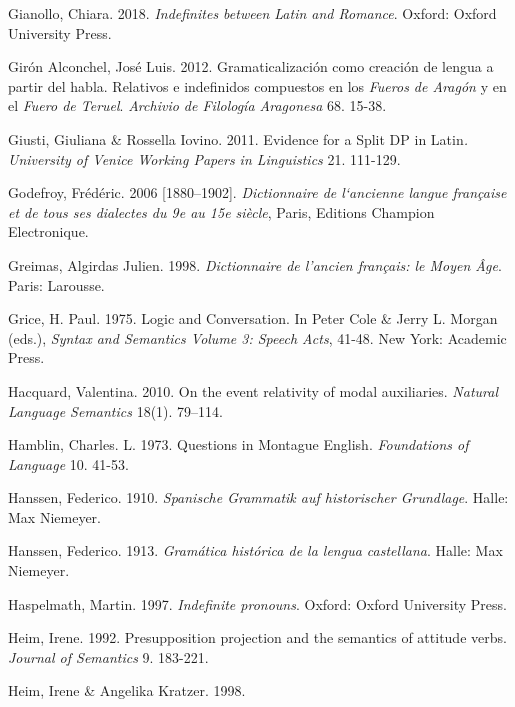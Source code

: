 \documentclass[output=paper]{langscibook}
\begin{document}
Gianollo, Chiara. 2018. \textit{Indefinites between Latin and Romance}. Oxford: Oxford University Press.

Girón Alconchel, José Luis. 2012. Gramaticalización como creación de lengua a partir del habla. Relativos e indefinidos compuestos en los \textit{Fueros de Aragón} y en el \textit{Fuero de Teruel}. \textit{Archivio de Filología Aragonesa} 68. 15-38.

Giusti, Giuliana \& Rossella Iovino. 2011. Evidence for a Split DP in Latin\textit{. University of Venice Working Papers in Linguistics} 21. 111-129.

Godefroy, Frédéric. 2006 [1880–1902]. \textit{Dictionnaire de l‘ancienne langue française et de tous ses dialectes du 9e au 15e siècle}, Paris, Editions Champion Electronique.

Greimas, Algirdas Julien. 1998. \textit{Dictionnaire de l’ancien français: le Moyen Âge}. Paris: Larousse.

Grice, H. Paul. 1975. Logic and Conversation. In Peter Cole \& Jerry L. Morgan (eds.), \textit{Syntax and Semantics Volume 3: Speech Acts}, 41-48. New York: Academic Press.

Hacquard, Valentina. 2010. On the event relativity of modal auxiliaries. \textit{Natural Language Semantics} 18(1). 79–114.

Hamblin, Charles. L. 1973. Questions in Montague English. \textit{Foundations of Language} 10. 41-53.

\begin{styleLiteraturStandard}
Hanssen, Federico. 1910. \textit{Spanische Grammatik auf historischer Grundlage}. Halle: Max Niemeyer.
\end{styleLiteraturStandard}

\begin{styleLiteraturStandard}
Hanssen, Federico. 1913. \textit{Gramática histórica de la lengua castellana}. Halle: Max Niemeyer.
\end{styleLiteraturStandard}

Haspelmath, Martin. 1997. \textit{Indefinite pronouns}. Oxford: Oxford University Press.

\begin{styleLiteraturStandard}
Heim, Irene. 1992. Presupposition projection and the semantics of attitude verbs. \textit{Journal of Semantics} 9. 183-221.
\end{styleLiteraturStandard}

Heim, Irene \& Angelika Kratzer. 1998. 
\end{document}
